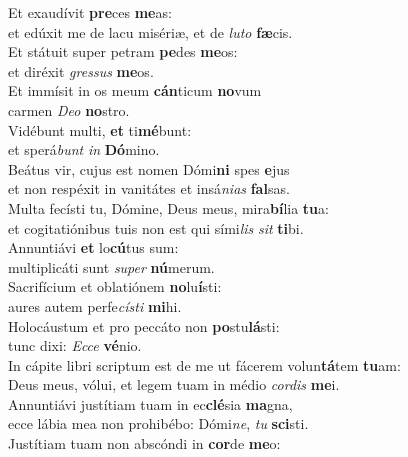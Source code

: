 \evenverse Et exaudívit \textbf{pre}ces \textbf{me}as:~\*\\
\evenverse et edúxit me de lacu misériæ, et de \textit{lu}\textit{to} \textbf{fæ}cis.\\
\oddverse Et státuit super petram \textbf{pe}des \textbf{me}os:~\*\\
\oddverse et diréxit \textit{gres}\textit{sus} \textbf{me}os.\\
\evenverse Et immísit in os meum \textbf{cán}ticum \textbf{no}vum~\*\\
\evenverse carmen \textit{De}\textit{o} \textbf{no}stro.\\
\oddverse Vidébunt multi, \textbf{et} ti\textbf{mé}bunt:~\*\\
\oddverse et sperá\textit{bunt} \textit{in} \textbf{Dó}mino.\\
\evenverse Beátus vir, cujus est nomen Dómi\textbf{ni} spes \textbf{e}jus~\*\\
\evenverse et non respéxit in vanitátes et insá\textit{ni}\textit{as} \textbf{fal}sas.\\
\oddverse Multa fecísti tu, Dómine, Deus meus, mira\textbf{bí}lia \textbf{tu}a:~\*\\
\oddverse et cogitatiónibus tuis non est qui sími\textit{lis} \textit{sit} \textbf{ti}bi.\\
\evenverse Annuntiávi \textbf{et} lo\textbf{cú}tus sum:~\*\\
\evenverse multiplicáti sunt \textit{su}\textit{per} \textbf{nú}merum.\\
\oddverse Sacrifícium et oblatiónem \textbf{no}lu\textbf{í}sti:~\*\\
\oddverse aures autem perfe\textit{cí}\textit{sti} \textbf{mi}hi.\\
\evenverse Holocáustum et pro peccáto non \textbf{po}stu\textbf{lá}sti:~\*\\
\evenverse tunc dixi: \textit{Ec}\textit{ce} \textbf{vé}nio.\\
\oddverse In cápite libri scriptum est de me ut fácerem volun\textbf{tá}tem \textbf{tu}am:~\*\\
\oddverse Deus meus, vólui, et legem tuam in médio \textit{cor}\textit{dis} \textbf{me}i.\\
\evenverse Annuntiávi justítiam tuam in ec\textbf{clé}sia \textbf{ma}gna,~\*\\
\evenverse ecce lábia mea non prohibébo: Dómi\textit{ne}, \textit{tu} \textbf{sci}sti.\\
\oddverse Justítiam tuam non abscóndi in \textbf{cor}de \textbf{me}o:~\*\\
